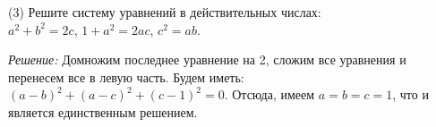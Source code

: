 \textsf{(3)}
Решите систему уравнений в действительных числах:\\
$a^2 + b^2 = 2 c$,\quad
$1 + a^2 = 2 a c$,\quad
$c^2 = a b$.



\solution
\emph{Решение:}
Домножим последнее уравнение на 2, сложим все уравнения и перенесем все в левую
часть.
Будем иметь: $(a - b)^2 + (a - c)^2 + (c - 1)^2 = 0$.
Отсюда, имеем $a = b = c = 1$, что и является единственным решением.

